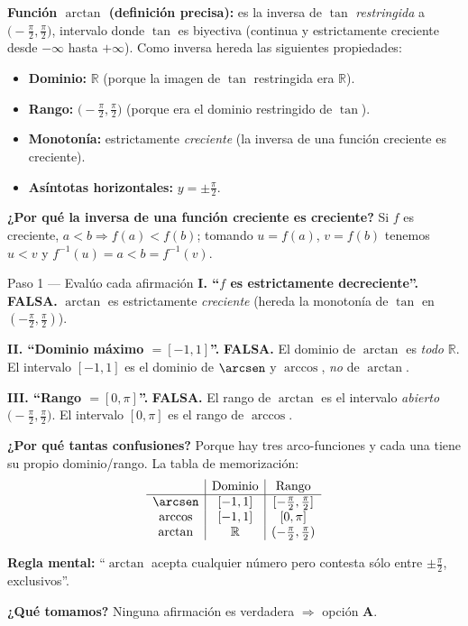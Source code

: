 \documentclass[11pt]{article}
\begin{document}
\begin{teo}
\textbf{Función $\arctan$ (definición precisa):} es la inversa de $\tan$ \emph{restringida} a $\bigl(-\tfrac{\pi}{2},\tfrac{\pi}{2}\bigr)$, intervalo donde $\tan$ es biyectiva (continua y estrictamente creciente desde $-\infty$ hasta $+\infty$). Como inversa hereda las siguientes propiedades:

\begin{itemize}[leftmargin=*]
  \item \textbf{Dominio:} $\mathbb{R}$ (porque la imagen de $\tan$ restringida era $\mathbb{R}$).
  \item \textbf{Rango:} $\bigl(-\tfrac{\pi}{2},\tfrac{\pi}{2}\bigr)$ (porque era el dominio restringido de $\tan$).
  \item \textbf{Monotonía:} estrictamente \emph{creciente} (la inversa de una función creciente es creciente).
  \item \textbf{Asíntotas horizontales:} $y=\pm\tfrac{\pi}{2}$.
\end{itemize}

\textbf{¿Por qué la inversa de una función creciente es creciente?} Si $f$ es creciente, $a<b\Rightarrow f(a)<f(b)$; tomando $u=f(a)$, $v=f(b)$ tenemos $u<v$ y $f^{-1}(u)=a<b=f^{-1}(v)$.
\end{teo}

\begin{paso}{Paso 1 --- Evalúo cada afirmación}
\textbf{I. ``$f$ es estrictamente decreciente''.} \textbf{FALSA.} $\arctan$ es estrictamente \emph{creciente} (hereda la monotonía de $\tan$ en $(-\tfrac{\pi}{2},\tfrac{\pi}{2})$).

\textbf{II. ``Dominio máximo $=[-1,1]$''.} \textbf{FALSA.} El dominio de $\arctan$ es \emph{todo} $\mathbb{R}$. El intervalo $[-1,1]$ es el dominio de $\arcsen$ y $\arccos$, \emph{no} de $\arctan$.

\textbf{III. ``Rango $=[0,\pi]$''.} \textbf{FALSA.} El rango de $\arctan$ es el intervalo \emph{abierto} $\bigl(-\tfrac{\pi}{2},\tfrac{\pi}{2}\bigr)$. El intervalo $[0,\pi]$ es el rango de $\arccos$.

\textbf{¿Por qué tantas confusiones?} Porque hay tres arco-funciones y cada una tiene su propio dominio/rango. La tabla de memorización:
\[
\begin{array}{c|c|c}
 & \text{Dominio} & \text{Rango}\\\hline
\arcsen & [-1,1] & [-\tfrac{\pi}{2},\tfrac{\pi}{2}]\\
\arccos & [-1,1] & [0,\pi]\\
\arctan & \mathbb{R} & (-\tfrac{\pi}{2},\tfrac{\pi}{2})
\end{array}
\]

\textbf{Regla mental:} ``$\arctan$ acepta cualquier número pero contesta sólo entre $\pm\tfrac{\pi}{2}$, exclusivos''.

\textbf{¿Qué tomamos?} Ninguna afirmación es verdadera $\Rightarrow$ opción \textbf{A}.
\end{paso}
\end{document}
